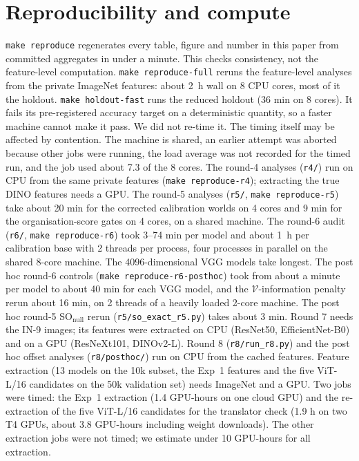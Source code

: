 \documentclass[10pt]{article}
\begin{document}
\section{Reproducibility and compute}
\label{app:repro}
\texttt{make reproduce} regenerates every table, figure and number in this paper from committed aggregates in under a minute. This checks consistency, not the feature-level computation.
\texttt{make reproduce-full} reruns the feature-level analyses from the private ImageNet features: about 2~h wall on 8 CPU cores, most of it the holdout.
\texttt{make holdout-fast} runs the reduced holdout (36 min on 8 cores). It fails its pre-registered accuracy target on a deterministic quantity, so a faster machine cannot make it pass. We did not re-time it. The timing itself may be affected by contention. The machine is shared, an earlier attempt was aborted because other jobs were running, the load average was not recorded for the timed run, and the job used about 7.3 of the 8 cores.
The round-4 analyses (\texttt{r4/}) run on CPU from the same private features (\texttt{make reproduce-r4}); extracting the true DINO features needs a GPU. The round-5 analyses (\texttt{r5/}, \texttt{make reproduce-r5}) take about 20 min for the corrected calibration worlds on 4 cores and 9 min for the organisation-score gates on 4 cores, on a shared machine. The round-6 audit (\texttt{r6/}, \texttt{make reproduce-r6}) took 3--74 min per model and about 1~h per calibration base with 2 threads per process, four processes in parallel on the shared 8-core machine. The 4096-dimensional VGG models take longest. The post hoc round-6 controls (\texttt{make reproduce-r6-posthoc}) took from about a minute per model to about 40 min for each VGG model, and the $\mathcal{V}$-information penalty rerun about 16 min, on 2 threads of a heavily loaded 2-core machine. The post hoc round-5 SO$_{\mathrm{null}}$ rerun (\texttt{r5/so\_exact\_r5.py}) takes about 3 min. Round 7 needs the IN-9 images; its features were extracted on CPU (ResNet50, EfficientNet-B0) and on a GPU (ResNeXt101, DINOv2-L). Round 8 (\texttt{r8/run\_r8.py}) and the post hoc offset analyses (\texttt{r8/posthoc/}) run on CPU from the cached features.
Feature extraction (13 models on the 10k subset, the Exp~1 features and the five ViT-L/16 candidates on the 50k validation set) needs ImageNet and a GPU. Two jobs were timed: the Exp~1 extraction (1.4 GPU-hours on one cloud GPU) and the re-extraction of the five ViT-L/16 candidates for the translator check (1.9 h on two T4 GPUs, about 3.8 GPU-hours including weight downloads). The other extraction jobs were not timed; we estimate under 10 GPU-hours for all extraction.
\end{document}
